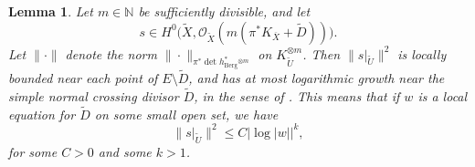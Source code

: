 \documentclass[10pt]{amsart}
\let\mathcal\mathscr
\theoremstyle{plain}
\newtheorem{lemma}[theorem]{Lemma}
\theoremstyle{definition}
\numberwithin{equation}{theorem}
\newcommand{\norm}[1] { \| #1 \| }
\begin{document}
\begin{lemma} \label{lemgrowth} Let $m \in \mathbb N$ be sufficiently divisible, and let\vspace*{-1pt}\enlargethispage{.5\baselineskip}%
$$s \in H^0 \bigl( \widetilde{X}, \mathcal O_{\widetilde{X}}(m (\pi^\ast K_{\overline{X}} + \widetilde{D})) \bigr).$$
Let $\norm{ \cdot }$ denote the norm $\norm{\cdot}_{\pi^\ast \det h_{\mathrm{Berg}}^\ast {}^{\otimes m}}$ on $K_{\widetilde{U}}^{\otimes m}$. Then $\norm{s|_{\widetilde{U}}}^2$ is locally bounded near each point of $E \setminus \widetilde{D}$, and has at most logarithmic growth near the simple normal crossing divisor $\widetilde{D}$, in the sense of \cite{Mum77}. This means that if $w$ is a local equation for $\widetilde{D}$ on some small open set, we have\vspace*{-3pt}
$$
\norm{s|_{\widetilde{U}}}^2 \leq C \left| \log |w| \right|^k,
$$
for some $C > 0$ and some $k > 1$.
\end{lemma}
\end{document}
